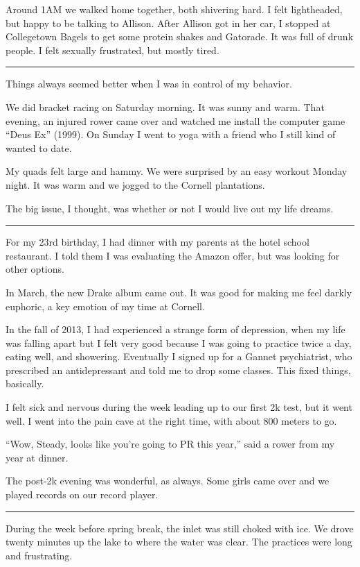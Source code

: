 Around 1AM we walked home together, both shivering hard.  I felt lightheaded,
but happy to be talking to Allison.  After Allison got in her car, I stopped at
Collegetown Bagels to get some protein shakes and Gatorade.  It was full of
drunk people.  I felt sexually frustrated, but mostly tired.

\plainfancybreak{12pt}{2}{* * *}

Things always seemed better when I was in control of my behavior.

We did bracket racing on Saturday morning.  It was sunny and warm.  That
evening, an injured rower came over and watched me install the computer game
``Deus Ex'' (1999).   On Sunday I went to yoga with a friend who I still kind of
wanted to date.

My quads felt large and hammy.  We were surprised by an easy workout Monday
night.  It was warm and we jogged to the Cornell plantations.

The big issue, I thought, was whether or not I would live out my life dreams.

\plainfancybreak{12pt}{2}{* * *}

For my 23rd birthday, I had dinner with my parents at the hotel school
restaurant.  I told them I was evaluating the Amazon offer, but was looking for
other options.

In March, the new Drake album came out.  It was good for making me feel darkly
euphoric, a key emotion of my time at Cornell.  

In the fall of 2013, I had experienced a strange form of depression, when my
life was falling apart but I felt very good because I was going to practice
twice a day, eating well, and showering.  Eventually I signed up for a Gannet
psychiatrist, who prescribed an antidepressant and told me to drop some classes.
This fixed things, basically. 

I felt sick and nervous during the week leading up to our first 2k test, but it
went well.  I went into the pain cave at the right time, with about 800 meters
to go.  

``Wow, Steady, looks like you're going to PR this year,'' said a rower from my
year at dinner.  

The post-2k evening was wonderful, as always.  Some girls came over and we
played records on our record player.  

\plainfancybreak{12pt}{2}{* * *}

During the week before spring break, the inlet was still choked with ice. We
drove twenty minutes up the lake to where the water was clear.  The practices
were long and frustrating.

